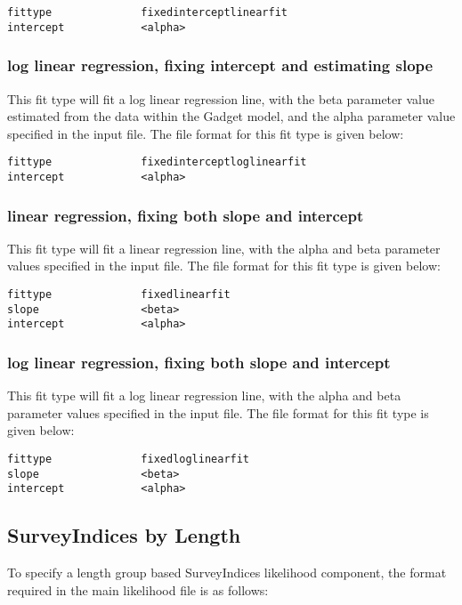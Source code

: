 \documentclass [a4paper, 10pt]{book}
\begin{document}
{\small\begin{verbatim}
fittype              fixedinterceptlinearfit
intercept            <alpha>
\end{verbatim}}

\subsubsection{log linear regression, fixing intercept and estimating slope}
This fit type will fit a log linear regression line, with the beta parameter value estimated from the data within the Gadget model, and the alpha parameter value specified in the input file.  The file format for this fit type is given below:

{\small\begin{verbatim}
fittype              fixedinterceptloglinearfit
intercept            <alpha>
\end{verbatim}}

\subsubsection{linear regression, fixing both slope and intercept}
This fit type will fit a linear regression line, with the alpha and beta parameter values specified in the input file.  The file format for this fit type is given below:

{\small\begin{verbatim}
fittype              fixedlinearfit
slope                <beta>
intercept            <alpha>
\end{verbatim}}

\subsubsection{log linear regression, fixing both slope and intercept}
This fit type will fit a log linear regression line, with the alpha and beta parameter values specified in the input file.  The file format for this fit type is given below:

{\small\begin{verbatim}
fittype              fixedloglinearfit
slope                <beta>
intercept            <alpha>
\end{verbatim}}

\newpage %
\subsection{SurveyIndices by Length}\label{subsec:sibylength}
To specify a length group based SurveyIndices likelihood component, the format required in the main likelihood file is as follows:
\end{document}
